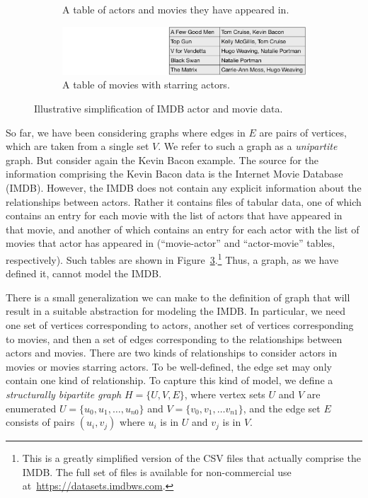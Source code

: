 \begin{figure}[ht]
\begin{subfigure}[t]{0.3\textwidth}
    \caption{\label{fig:actor-movie-table}
    A table of actors and movies they have appeared in.}
  \end{subfigure}
\hspace{1em}
       \begin{subfigure}[t]{0.3\textwidth}
    \small
    \centering
    \includegraphics[width=0.9\linewidth]{figs/movie-actor-table.pdf}
    \caption{\label{fig:movie-actor-table}
    A table of movies with starring actors.}
  \end{subfigure}
  \caption{Illustrative simplification of IMDB actor and movie data.\label{fig:imdb}}

\end{figure}


So far, we have been considering graphs where 
edges in $E$ are pairs of vertices, which are taken from a single set $V$.
%
We refer to such a graph as a \emph{unipartite} graph.
%
But consider again the Kevin Bacon example.  The source for the information comprising the Kevin Bacon data is the Internet Movie Database (IMDB).  
However, the IMDB does not contain any explicit information about the relationships between actors.  
%
Rather it contains files of tabular data, one of which contains an entry for each movie with the list of actors that have appeared in that movie,
and another of which contains an entry for each actor with the list of movies that actor has
appeared in (``movie-actor'' and ``actor-movie'' tables, respectively).  Such tables are shown in Figure~\ref{fig:imdb}.\footnote{This is a greatly simplified version of the CSV files that actually comprise the IMDB.  The full set of files is available for non-commercial use at~\url{https://datasets.imdbws.com}.}
%
Thus, a graph, as we have defined it, cannot model the IMDB.  

There is a small generalization we can make to the definition of graph that will result in a suitable abstraction for modeling the IMDB.  In particular, we need one set of vertices corresponding to actors, another set of vertices corresponding to movies, and then a set of edges corresponding to the relationships between actors and movies.  There are two kinds of relationships to consider actors in movies or movies starring actors.  To be well-defined, the edge set may only contain one kind of relationship.  To capture this kind of model, we define a \emph{structurally bipartite graph} $H = \{ U, V, E \}$, where vertex sets $U$ and $V$ are enumerated $U = \{ u_0, u_1, \ldots , u_{n0} \}$ and $V  = \{ v_0, v_1, \ldots v_{n1}\}$, 
and the edge set $E$ consists of pairs $(u_i, v_j)$ where $u_i$ is in $U$ and $v_j$ is in $V$.


